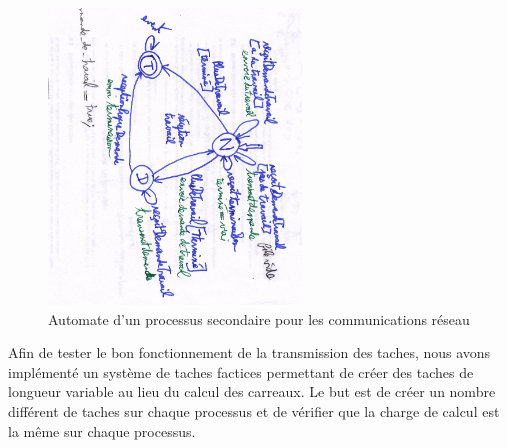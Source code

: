 \begin{figure}[H]
\centering
\includegraphics[width=0.6\textwidth]{automate.jpg}
\caption{Automate d'un processus secondaire pour les communications réseau}
\label{fig:diff}
\end{figure}

Afin de tester le bon fonctionnement de la transmission des taches, nous avons implémenté un système de taches factices permettant de créer des taches de longueur variable au lieu du calcul des carreaux. Le but est de créer un nombre différent de taches sur chaque processus et de vérifier que la charge de calcul est la même sur chaque processus.

